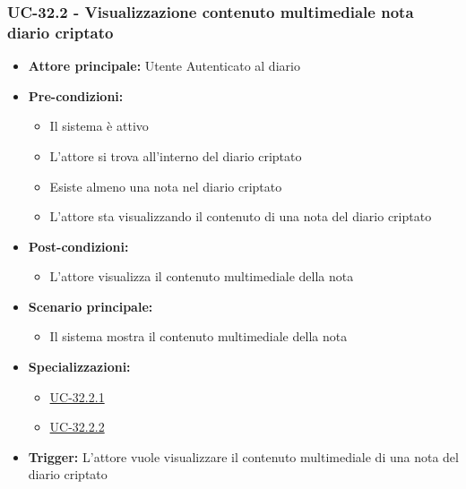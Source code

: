 \documentclass[a4paper,12pt]{article}
\begin{document}
\subsubsection{UC-32.2 - Visualizzazione contenuto multimediale nota diario criptato} \label{subsec:UC-32.2}
\begin{itemize}
    \item \textbf{Attore principale:} Utente Autenticato al diario
    \item \textbf{Pre-condizioni:}
    \begin{itemize}
        \item Il sistema è attivo
        \item L'attore si trova all'interno del diario criptato
        \item Esiste almeno una nota nel diario criptato
        \item L'attore sta visualizzando il contenuto di una nota del diario criptato
    \end{itemize}
    \item \textbf{Post-condizioni:}
    \begin{itemize}
        \item L'attore visualizza il contenuto multimediale della nota
    \end{itemize}
    \item \textbf{Scenario principale:}
    \begin{itemize}
        \item Il sistema mostra il contenuto multimediale della nota 
    \end{itemize}
    \item \textbf{Specializzazioni:}
    \begin{itemize}
        \item \hyperref[subsec:UC-32.2.1]{UC-32.2.1}
        \item \hyperref[subsec:UC-32.2.2]{UC-32.2.2}
    \end{itemize}
    \item \textbf{Trigger:} L'attore vuole visualizzare il contenuto multimediale di una nota del diario criptato
\end{itemize}
\end{document}
